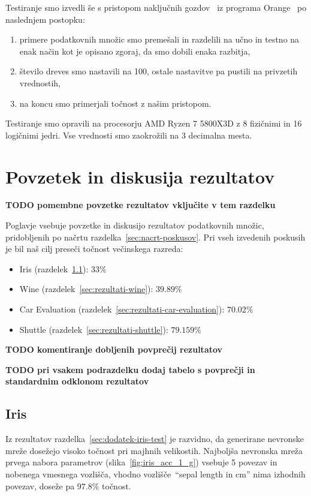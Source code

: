 \documentclass[a4paper,12pt,openright]{book}
\begin{document}
    Testiranje smo izvedli še s pristopom naključnih gozdov~\cite{inteligentni_sistemi_2010} iz programa Orange~\cite{JMLR:demsar13a} po naslednjem postopku:
    \begin{enumerate}
        \item primere podatkovnih množic smo premešali in razdelili na učno in testno na enak način kot je opisano zgoraj,
        da smo dobili enaka razbitja,
        \item število dreves smo nastavili na 100, ostale nastavitve pa pustili na privzetih vrednostih,
        \item na koncu smo primerjali točnost z našim pristopom.
    \end{enumerate}

    Testiranje smo opravili na procesorju AMD Ryzen 7 5800X3D z 8 fizičnimi in 16 logičnimi jedri.
    Vse vrednosti smo zaokrožili na 3 decimalna mesta.


    \chapter{Povzetek in diskusija rezultatov}\label{ch:rezultati}
    \textbf{TODO pomembne povzetke rezultatov vključite v tem razdelku}

    Poglavje vsebuje povzetke in diskusijo rezultatov podatkovnih množic, pridobljenih po načrtu razdelka~\ref{sec:nacrt-poskusov}.
    Pri vseh izvedenih poskusih je bil naš cilj preseči točnost večinskega razreda:
    \begin{itemize}
        \item{Iris (razdelek~\ref{sec:rezultati-iris}): $33\%$}
        \item{Wine (razdelek~\ref{sec:rezultati-wine}): $39.89\%$}
        \item{Car Evaluation (razdelek~\ref{sec:rezultati-car-evaluation}): $70.02\%$}
        \item{Shuttle (razdelek~\ref{sec:rezultati-shuttle}): $79.159\%$}
    \end{itemize}
    
    \textbf{TODO komentiranje dobljenih povprečij rezultatov}
    
    \textbf{TODO pri vsakem podrazdelku dodaj tabelo s povprečji in standardnim odklonom rezultatov}

    \section{Iris}\label{sec:rezultati-iris}
    Iz rezultatov razdelka~\ref{sec:dodatek-iris-test} je razvidno, da generirane nevronske mreže do\-se\-že\-jo visoko točnost pri majhnih velikostih.
    Najboljša nevronska mreža prvega nabora parametrov (slika~\ref{fig:iris_acc_1_g}) vsebuje 5 povezav in nobenega vmesnega vozlišča,
    vhodno vozlišče~\enquote{sepal length in cm} nima izhodnih povezav, doseže pa $97.8\%$ točnost.
\end{document}

